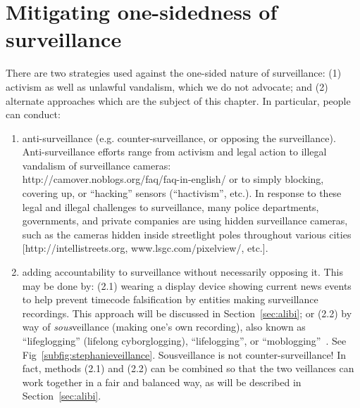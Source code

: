\section{Mitigating one-sidedness of surveillance}
There are two strategies used against the one-sided nature of surveillance:
(1) activism as well as unlawful vandalism, which we do not advocate;
and (2) alternate approaches which are the subject of this chapter.
In particular, people can conduct:
\begin{enumerate}
  \item anti-surveillance (e.g. counter-surveillance, or opposing the
        surveillance).  Anti-surveillance efforts range from
        activism and legal action to illegal
        vandalism of surveillance cameras:
        \\http://camover.noblogs.org/faq/faq-in-english/
        or to simply blocking,
        covering up, or ``hacking'' sensors (``hactivism'', etc.).
        In response to these legal and illegal challenges to surveillance,
        many police departments, governments, and private companies are
        using hidden surveillance cameras, such as the cameras
        hidden inside streetlight poles throughout various cities
        [http://intellistreets.org, www.lsgc.com/pixelview/, etc.].
  \item adding accountability to surveillance without necessarily
        opposing it.
        This may be done by:
        (2.1) wearing a display device showing current news events to help
        prevent timecode falsification by entities making surveillance
        recordings.  This approach will be discussed in Section~\ref{sec:alibi};
        or (2.2) by way of {\em sous}veillance (making one's own recording),
        also known as
        ``lifeglogging'' (lifelong cyborglogging), ``lifelogging'', or
        ``moblogging''~\cite{mann2006cyborglogging, mann2002sousveillance, fletcher2011,
                       michael2012sousveillance, bradwell2012security}.
        See Fig~\ref{subfig:stephanieveillance}.
        Sousveillance is not counter-surveillance!  In fact, methods
        (2.1) and (2.2) can be combined so that the two veillances can work
        together in a fair and balanced way, as will be described in
        Section~\ref{sec:alibi}.
\end{enumerate}

